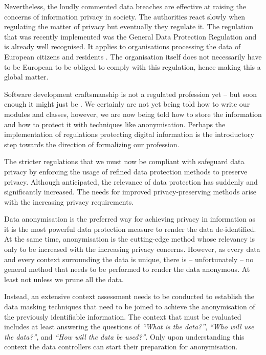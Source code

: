 \documentclass[a4paper,twoside,12pt]{book}
\begin{document}
Nevertheless, the loudly commented data breaches are effective at raising the concerns of information privacy in society. The authorities react slowly when regulating the matter of privacy but eventually they regulate it. The regulation that was recently implemented was the General Data Protection Regulation and is already well recognised. It applies to organisations processing the data of European citizens and residents \cite{bib:gdpr_outside_eu}. The organisation itself does not necessarily have to be European to be obliged to comply with this regulation, hence making this a global matter.


Software development craftsmanship is not a regulated profession yet -- but soon enough it might just be \cite{bib:we_rule_the_world}. We certainly are not yet being told how to write our modules and classes, however, we are now being told how to store the information and how to protect it with techniques like anonymisation. Perhaps the implementation of regulations protecting digital information is the introductory step towards the direction of formalizing our profession.


The stricter regulations that we must now be compliant with safeguard data privacy by enforcing the usage of refined data protection methods to preserve privacy. Although anticipated, the relevance of data protection has suddenly and significantly increased. The needs for improved privacy-preserving methods arise with the increasing privacy requirements.

Data anonymisation is the preferred way for achieving privacy in information as it is the most powerful data protection measure to render the data de-identified. At the same time, anonymisation is the cutting-edge method whose relevancy is only to be increased with the increasing privacy concerns. However, as every data and every context surrounding the data is unique, there is -- unfortunately -- no general method that needs to be performed to render the data anonymous. At least not unless we prune all the data. 

Instead, an extensive context assessment needs to be conducted to establish the data masking techniques that need to be joined to achieve the anonymisation of the previously identifiable information. The context that must be evaluated includes at least answering the questions of \textit{``What is the data?''}, \textit{``Who will use the data?''}, and \textit{``How will the data be used?''}. Only upon understanding this context the data controllers can start their preparation for anonymisation.
\end{document}
